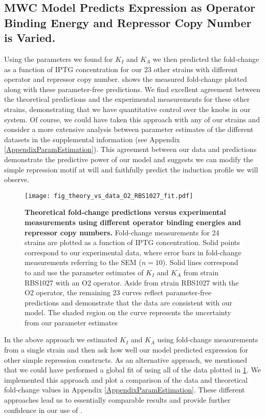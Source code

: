 \subsection*{MWC Model Predicts Expression as Operator Binding Energy and Repressor Copy Number is Varied.}

Using the parameters we found for $K_I$ and $K_A$ we then predicted the fold-change as a function of IPTG concentration for our 23 other strains with different operator and repressor copy number.  shows the measured fold-change plotted along with these parameter-free predictions. We find excellent agreement between the theoretical predictions and the experimental measurements for these other strains, demonstrating that we have quantitative control over the knobs in our system. Of course, we could have taken this approach with any of our strains and consider a more extensive analysis between parameter estimates of the different datasets in the supplemental information (see Appendix \ref{AppendixParamEstimation}). This agreement between our data and predictions demonstrate the predictive power of our model and suggests we can modify the simple repression motif at will and faithfully predict the induction profile we will observe.

\begin{figure}[h]
	\centering
	\texttt{[image: fig\_theory\_vs\_data\_O2\_RBS1027\_fit.pdf]}
	\caption{{\bf Theoretical fold-change predictions versus experimental measurements using different operator binding energies and repressor copy numbers.} Fold-change measurements for 24 strains are plotted as a function of IPTG concentration. Solid points correspond to our experimental data, where error bars in fold-change measurements referring to the SEM ($n=10$). Solid lines correspond to	\eref[eq7] and use the parameter estimates of $K_I$ and $K_A$ from	strain RBS1027 with an O2 operator. Aside from strain RBS1027 with the O2	operator, the remaining 23 curves reflect parameter-free predictions and demonstrate that the data are consistent with our model. The shaded region on the curve represents the uncertainty from our parameter estimates}
	\label{fig_result2}
\end{figure}

In the above approach we estimated $K_I$ and $K_A$ using fold-change measurements from a single strain and then ask how well our model predicted expression for other simple repression constructs. As an alternative approach, we mentioned that we could have performed a global fit of \eref[eq7] using all of the data plotted in \ref{fig_result2}. We implemented this approach and plot a comparison of the data and theoretical fold-change values in Appendix \ref{AppendixParamEstimation}. These different approaches lead us to essentially comparable results and provide further confidence in our use of \eref[eq7].

